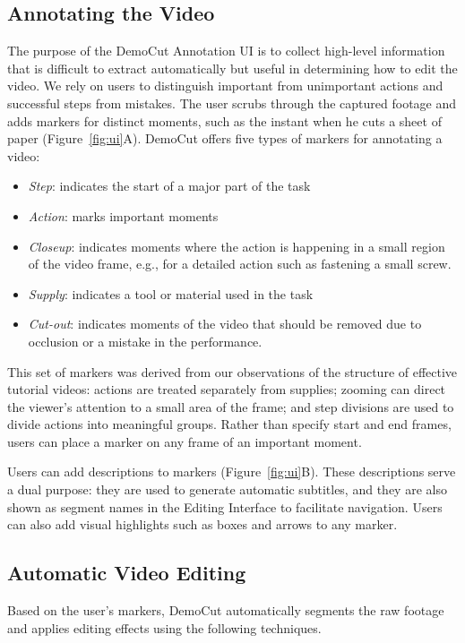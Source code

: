 \subsection{Annotating the Video}
The purpose of the DemoCut Annotation UI is to collect high-level information that is difficult to extract automatically but useful in determining how to edit the video.
We rely on users to distinguish important from unimportant actions and successful steps from mistakes.
The user scrubs through the captured footage and adds markers for distinct moments, such as the instant when he cuts a sheet of paper (Figure~\ref{fig:ui}A). DemoCut offers five types of markers for annotating a video:
\begin{itemize}
  \setlength{\itemsep}{0pt}
  \item \emph{Step}: indicates the start of a major part of the task
  \item \emph{Action}: marks important moments
  \item \emph{Closeup}: indicates moments where the action is happening in a small region of the video frame, e.g., for a detailed action such as fastening a small screw. %
  \item \emph{Supply}: indicates a tool or material used in the task
  \item \emph{Cut-out}: indicates moments of the video that should be removed due to occlusion or a mistake in the performance.
\end{itemize}
This set of markers was derived from our observations of the structure of effective tutorial videos: actions are treated separately from supplies; zooming can direct the viewer's attention to a small area of the frame; and step divisions are used to divide actions into meaningful groups. Rather than specify start and end frames, users can place a marker on any frame of an important moment.

Users can add descriptions to markers (Figure~\ref{fig:ui}B). These descriptions serve a dual purpose: they are used to generate automatic subtitles, and they are also shown as segment names in the Editing Interface to facilitate navigation. Users can also add visual highlights such as boxes and arrows to any marker.

\subsection{Automatic Video Editing}
Based on the user's markers, DemoCut automatically segments the raw footage and applies editing effects using the following techniques.

